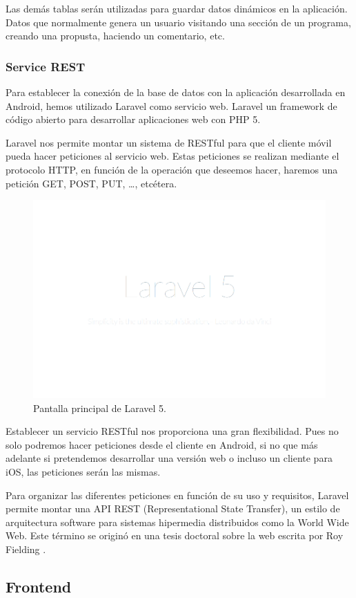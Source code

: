 Las demás tablas serán utilizadas para guardar datos dinámicos en la aplicación. Datos que normalmente genera un usuario visitando una sección de un programa, creando una propusta, haciendo un comentario, etc.

    
		\subsubsection{Service REST}\label{sssec:rest}
		
Para establecer la conexión de la base de datos con la aplicación desarrollada en Android, hemos utilizado Laravel como servicio web. Laravel \cite{ref:laravel}  un framework de código abierto para desarrollar aplicaciones web con PHP 5.

Laravel nos permite montar un sistema de RESTful para que el cliente móvil pueda hacer peticiones al servicio web. Estas peticiones se realizan mediante el protocolo HTTP, en función de la operación que deseemos hacer, haremos una petición GET, POST, PUT, …, etcétera.

	\begin{figure}[H]
      \centering
	\includegraphics[keepaspectratio, scale=0.30]{Media/Captures/laravel5.png}
      \caption{Pantalla principal de Laravel 5.}
      \label{fig:laravel5}
    \end{figure}

Establecer un servicio RESTful nos proporciona una gran flexibilidad. Pues no solo podremos hacer peticiones desde el cliente en Android, si no que más adelante si pretendemos desarrollar una versión web o incluso un cliente para iOS, las peticiones serán las mismas.

Para organizar las diferentes peticiones en función de su uso y requisitos, Laravel permite montar una API REST (Representational State Transfer), un estilo de arquitectura software para sistemas hipermedia distribuidos como la World Wide Web. Este término se originó en una tesis doctoral sobre la web escrita por Roy Fielding \cite{ref:RESTPhd}.

  \subsection{Frontend}
